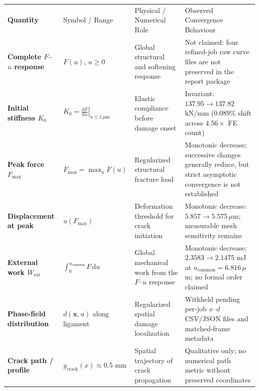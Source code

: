 \documentclass[10pt,a4paper]{article}
\newcommand{\headrow}{\color{navy}\bfseries}
\begin{document}
\scriptsize
\renewcommand{\arraystretch}{1.08}
\par\smallskip\noindent
\begin{tabularx}{\textwidth}{>{\bfseries}p{34mm}p{28mm}p{44mm}Y}
\headrow Quantity & Symbol / Range & Physical / Numerical Role & Observed Convergence Behaviour\\
Complete $F$--$u$ response & $F(u)$, $u \ge 0$ & Global structural and softening response & Not claimed: four refined-job raw curve files are not preserved in the report package\\
Initial stiffness $K_0$ & $K_0 = \left.\frac{\mathrm{d}F}{\mathrm{d}u}\right|_{u \le 1\,\mu\mathrm{m}}$ & Elastic compliance before damage onset & Invariant: $137.95 \to 137.82$ kN/mm ($0.089\%$ shift across $4.56\times$ FE count)\\
Peak force $F_{\max}$ & $F_{\max} = \max_u F(u)$ & Regularized structural fracture load & Monotonic decrease; successive changes generally reduce, but strict asymptotic convergence is not established\\
Displacement at peak & $u(F_{\max})$ & Deformation threshold for crack initiation & Monotonic decrease: $5.857 \to 5.575\,\mu$m; measurable mesh sensitivity remains\\
External work $W_{\mathrm{ext}}$ & $\int_0^{u_{\mathrm{common}}} F\,\mathrm{d}u$ & Global mechanical work from the $F$--$u$ response & Monotonic decrease: $2.3583 \to 2.1475$ mJ at $u_{\mathrm{common}}=6.816\,\mu$m; no formal order claimed\\
Phase-field distribution & $d(\mathbf{x}, u)$ along ligament & Regularized spatial damage localization & Withheld pending per-job $x$--$d$ CSV/JSON files and matched-frame metadata\\
Crack path / profile & $y_{\mathrm{crack}}(x) \approx 0.5$ mm & Spatial trajectory of crack propagation & Qualitative only; no numerical path metric without preserved coordinates\\
\end{tabularx}\par
\renewcommand{\arraystretch}{1}
\normalsize
\end{document}
